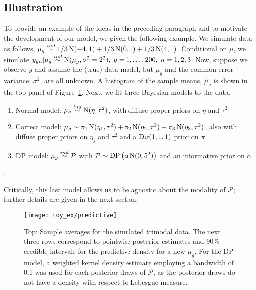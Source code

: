 \subsection{Illustration}
\label{subsec:illustration}
To provide an example of the ideas in the preceding paragraph and to motivate the development of our model, we given the following example. 
We simulate data as follows, $\mu_g \stackrel{ind}{\sim} 1/3\operatorname{N}(-4,1)+1/3\operatorname{N}(0,1)+1/3\operatorname{N}(4,1)$. Conditional on $\mu$, we simulate $y_{gn}|\mu_g \stackrel{ind}{\sim} \operatorname{N}(\mu_g,\sigma^2=2^2),\; g=1,\ldots,200,\;n=1,2,3$. Now, suppose we observe $y$ and assume the (true) data model, but $\mu_g$ and the common error variance, $\sigma^2$, are all unknown. A histogram of the sample means, $\hat{\mu}_g$ is shown in the top panel of Figure~\ref{predictive}. Next, we fit three Bayesian models to the data.
\begin{enumerate}
\item Normal model: $\mu_g \stackrel{ind}{\sim} \operatorname{N}(\eta, \tau^2)$, with diffuse proper priors on $\eta$ and $\tau^2$
\item Correct model: $\mu_g \sim \pi_1\operatorname{N}(\eta_1,\tau^2)+\pi_2\operatorname{N}(\eta_2,\tau^2)+\pi_3\operatorname{N}(\eta_3,\tau^2)$, also with diffuse proper priors on $\eta_j$ and $\tau^2$ and a $\operatorname{Dir}(1,1,1)$ prior on $\pi$
\item DP model: $\mu_g \stackrel{ind}{\sim} \mathcal{P}$ with $\mathcal{P} \sim \operatorname{DP}\left(\alpha \operatorname{N}(0,5^2)\right)$ and an informative prior on $\alpha$
\end{enumerate}. 

Critically, this last model allows us to be agnostic about the modality of $\mathcal{P}$; further details are given in the next section.

\begin{figure}[ht]
\centering
\texttt{[image: toy\_ex/predictive]}
\begin{minipage}{.8\textwidth}
\caption{\small Top: Sample averages for the simulated trimodal data. The next three rows correspond to pointwise posterior estimates and 90\% credible intervals for the predictive density for a new $\mu_g$. For the DP model, a weighted kernel density estimate employing a bandwidth of 0.1  was used for each posterior draws of $\mathcal{P}$, as the posterior draws do not have a density with respect to Lebesgue measure.}
\label{predictive}
\end{minipage}
\end{figure}


